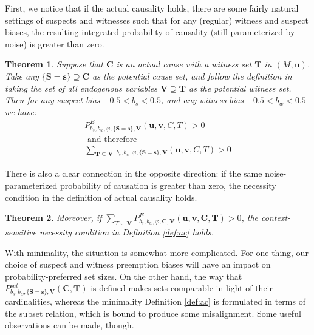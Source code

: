 \documentclass[twoside,11pt]{article}
\newtheorem{theorem}{Theorem}
\begin{document}
First, we notice that if the actual causality holds, there are some fairly natural settings of suspects and witnesses such that for any (regular) witness and suspect biases, the resulting integrated probability of causality (still parameterized by noise) is greater than zero.


\begin{theorem}\label{th:ac-exp}
    Suppose that $\mathbf{C}$ is an actual cause with a witness set $\mathbf{T}$ in $(M, \mathbf{u})$.  Take any  $\{\mathbf{S} = \mathbf{s}\} \supseteq \mathbf{C}$ as the potential cause set, and follow the definition in taking the set of all endogenous variables $\mathbf{V} \supseteq \mathbf{T}$ as the potential witness set. Then for any suspect bias  $ - 0.5 < b_s < 0.5$, and  any witness  bias $ - 0.5 < b_w < 0.5$ we have: \begin{align}
    P^{E}_{b_s, b_w , \varphi, \{\mathbf{S} = \mathbf{s}\}, \mathbf{V}}(\mathbf{u}, \mathbf{v}, C, T) > 0 \label{eq:pect}\\
    \text{ and therefore } \nonumber\\ 
\sum_{\mathbf{T} \subseteq \mathbf{V}}\, _{b_s, b_w , \varphi, \{\mathbf{S} = \mathbf{s}\}, \mathbf{V}}(\mathbf{u}, \mathbf{v}, C, T) > 0 \end{align}
\end{theorem}


There is also a clear connection in the opposite direction: if the same noise-parameterized probability of causation is greater than zero, the necessity condition in the definition of actual causality holds.


\begin{theorem}\label{th:exp-ac} Moreover, if  
$\sum_{T \subseteq \mathbf{V}} P^{E}_{b_s, b_w, \varphi, \mathbf{C}, \mathbf{V}}(\mathbf{u}, \mathbf{v}, \mathbf{C}, \mathbf{T}) > 0$,  the context-sensitive necessity condition in Definition \ref{def:ac} holds. \label{th:if_pr_then_nec}
\end{theorem}






With minimality, the situation is somewhat more complicated. For one thing, our choice of suspect and witness preemption biases will have an impact on probability-preferred set sizes. On the other hand, the way that  $P^{\mathit{set}}_{b_s,b_w, \{\mathbf{S}=\mathbf{s}\}, \mathbf{V}}(\mathbf{C}, \mathbf{T})$ is defined makes sets comparable in light of their cardinalities, whereas the minimality Definition \ref{def:ac}  is formulated in terms of the subset relation, which is bound to produce some misalignment. Some useful observations can be made, though.
\end{document}
